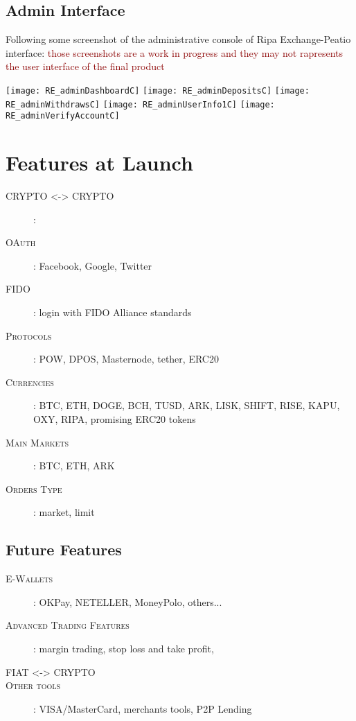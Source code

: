 \documentclass[11pt,fleqn,oneside]{book} %
\begin{document}
\subsection{Admin Interface}
Following some screenshot of the administrative console of Ripa Exchange-Peatio interface: 
\textcolor{darkred}{those screenshots are a work in progress and they may not rapresents the user interface of the final product}\\
\begin{center}
	\texttt{[image: RE\_adminDashboardC]}
	\texttt{[image: RE\_adminDepositsC]}
	\texttt{[image: RE\_adminWithdrawsC]}
	\texttt{[image: RE\_adminUserInfo1C]}
	\texttt{[image: RE\_adminVerifyAccountC]}
\end{center}

\section{Features at Launch}
\begin{description}
	\item[\textsc{CRYPTO <-> CRYPTO}]:
	\item[\textsc{OAuth}]: Facebook, Google, Twitter
	\item[\textsc{FIDO}]: login with FIDO Alliance standards
	\item[\textsc{Protocols}]: POW, DPOS, Masternode, tether, ERC20
	\item[\textsc{Currencies}]: BTC, ETH, DOGE, BCH, TUSD, ARK, LISK, SHIFT, RISE, KAPU, OXY, RIPA, promising ERC20 tokens
	\item[\textsc{Main Markets}]: BTC, ETH, ARK
	\item[\textsc{Orders Type}]: market, limit
\end{description}

\subsection{Future Features}
\begin{description}
	\item[\textsc{E-Wallets}]: OKPay, NETELLER, MoneyPolo, others...
	\item[\textsc{Advanced Trading Features}]: margin trading, stop loss and take profit, 
	\item[\textsc{FIAT <-> CRYPTO}]
	\item[\textsc{Other tools}]: VISA/MasterCard, merchants tools, P2P Lending 
\end{description}
\end{document}

